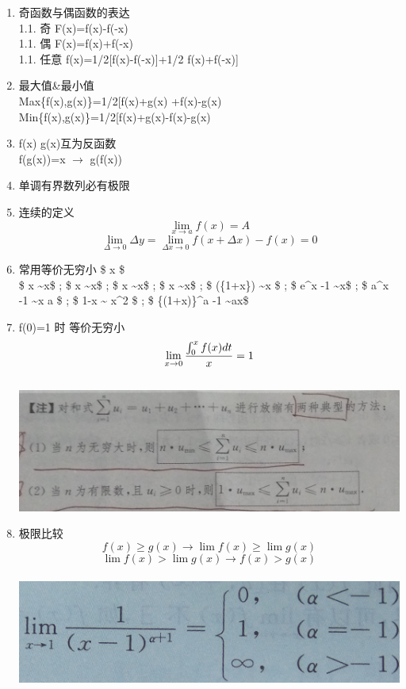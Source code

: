 \documentclass[11pt]{article}
\makeatletter
\def\maxwidth{\ifdim\Gin@nat@width>\linewidth\linewidth
    \else\Gin@nat@width\fi}
\let\Oldincludegraphics\includegraphics
\renewcommand{\includegraphics}[1]{\Oldincludegraphics[width=.8\maxwidth]{#1}}
\makeatother
\begin{document}
\begin{enumerate}
\item
  奇函数与偶函数的表达\\
  1.1. 奇 F(x)=f(x)-f(-x)\\
  1.1. 偶 F(x)=f(x)+f(-x)\\
  1.1. 任意 f(x)=1/2{[}f(x)-f(-x){]}+1/2 f(x)+f(-x){]}\\
\item
  最大值\&最小值\\
  Max\{f(x),g(x)\}=1/2{[}f(x)+g(x) +\textbar{}f(x)-g(x)\textbar{}{]}\\
  Min\{f(x),g(x)\}=1/2{[}f(x)+g(x)-\textbar{}f(x)-g(x)\textbar{}{]}
\item
  f(x) g(x)互为反函数\\
  f(g(x))=x \(\rightarrow\) g(f(x))
\item
  单调有界数列必有极限\\
\item
  连续的定义\\
  \[ \lim_{x\rightarrow a}f(x)=A\]
  \[ \lim_{\Delta\rightarrow0}\Delta y=\lim_{\Delta x \rightarrow 0 } f(x+ \Delta x) - f(x)=0\]
\item
  常用等价无穷小 \$ x \$\\
  \$ \sin x \sim x\$ ; \$ \tan x \sim x\$ ; \$ \arcsin x \sim x\$ ; \$
  \arctan x \sim x\$ ; \$ \ln(\{1+x\}) \sim x \$ ; \$ e\^{}x -1 \sim x\$
  ; \$ a\^{}x -1 \sim x \ln a \$ ; \$ 1-\cos x \sim {} x\^{}2
  \$ ; \$ \{(1+x)\}\^{}a -1 \sim ax\$\\
\item
  f(0)=1 时 等价无穷小
  \[ \lim_{x \rightarrow 0 } {{\int_0^x f(x)dt} \over {x}} =1\]\\
  \includegraphics{9345E7/9345E74D588F5883C9985F64C9B1.jpg}
\item
  极限比较\\
  \[ f(x) \geq g(x) \rightarrow \lim f(x) \geq \lim g(x) \]
  \[ \lim f(x) > \lim g(x) \rightarrow f(x) > g(x) \]\\
  \includegraphics{9345E7/FA713494D7721783E05C994D3FC274D0.jpg}

\end{enumerate}
\end{document}
